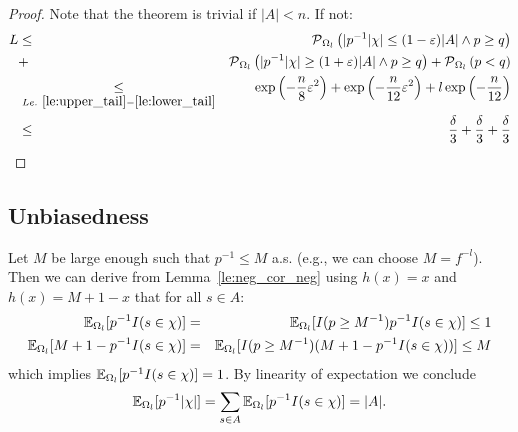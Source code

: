 \begin{proof}
Note that the theorem is trivial if $|A| < n$. If not:
\begin{eqnarray*}
  L & \leq & \operatorname{\mathcal P}_{\Omega_l} \left( | p^{-1} |\chi| \leq (1-\varepsilon) |A| \wedge p \geq q \right)\\
  & + &
    \operatorname{\mathcal P}_{\Omega_l} \left( | p^{-1} |\chi| \geq (1+\varepsilon) |A| \wedge p \geq q \right) +
    \operatorname{\mathcal P}_{\Omega_l} \left( p < q \right) \\
    & \underset{Le.~\ref{le:upper_tail}-\ref{le:lower_tail}}{\leq} &
    \exp\left( - \frac{n}{8} \varepsilon^2 \right)  + \exp\left( - \frac{n}{12} \varepsilon^2 \right) + 
    l \exp\left( - \frac{n}{12} \right) \\
    & \leq & \frac{\delta}{3} + \frac{\delta}{3} + \frac{\delta}{3}
\end{eqnarray*}
\end{proof}
\subsection{Unbiasedness\label{sec:unbiasedness}}
Let $M$ be large enough such that $p^{-1} \leq M$ a.s. (e.g., we can choose $M = f^{-l}$).
Then we can derive from Lemma~\ref{le:neg_cor_neg} using $h(x) = x$ and $h(x) = M+1-x$ that
for all $s \in A$:
\begin{eqnarray*}
  \operatorname{\mathbb E}_{\Omega_l} [ p^{-1} I(s \in \chi) ] & = &
    \operatorname{\mathbb E}_{\Omega_l} [ I(p \geq M^{-1}) p^{-1} I(s \in \chi) ] \leq 1 \\
  \operatorname{\mathbb E}_{\Omega_l} [ M + 1 - p^{-1} I(s \in \chi) ] & = &
    \operatorname{\mathbb E}_{\Omega_l} [ I(p \geq M^{-1}) (M + 1 - p^{-1} I(s \in \chi)) ] \leq M
\end{eqnarray*}
which implies $\operatorname{\mathbb E}_{\Omega_l} [ p^{-1} I(s \in \chi) ] = 1$.
By linearity of expectation we conclude
\[
  \operatorname{\mathbb E}_{\Omega_l} [ p^{-1} |\chi| ] =
    \sum_{s \in A} \operatorname{\mathbb E}_{\Omega_l} [ p^{-1} I(s \in \chi) ] = |A| \textrm{.}
\]
